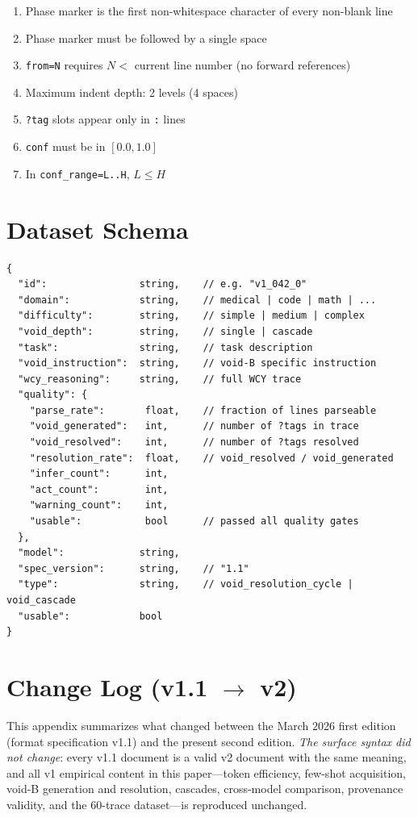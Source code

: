\documentclass[11pt,a4paper]{article}
\begin{document}
\begin{enumerate}[leftmargin=*,itemsep=2pt]
  \item Phase marker is the first non-whitespace character of every non-blank line
  \item Phase marker must be followed by a single space
  \item \texttt{from=N} requires $N <$ current line number (no forward references)
  \item Maximum indent depth: 2 levels (4 spaces)
  \item \texttt{?tag} slots appear only in \texttt{:} lines
  \item \texttt{conf} must be in $[0.0, 1.0]$
  \item In \texttt{conf\_range=L..H}, $L \leq H$
\end{enumerate}

\section{Dataset Schema}
\label{app:schema}

\begin{lstlisting}[language={}]
{
  "id":                string,    // e.g. "v1_042_0"
  "domain":            string,    // medical | code | math | ...
  "difficulty":        string,    // simple | medium | complex
  "void_depth":        string,    // single | cascade
  "task":              string,    // task description
  "void_instruction":  string,    // void-B specific instruction
  "wcy_reasoning":     string,    // full WCY trace
  "quality": {
    "parse_rate":       float,    // fraction of lines parseable
    "void_generated":   int,      // number of ?tags in trace
    "void_resolved":    int,      // number of ?tags resolved
    "resolution_rate":  float,    // void_resolved / void_generated
    "infer_count":      int,
    "act_count":        int,
    "warning_count":    int,
    "usable":           bool      // passed all quality gates
  },
  "model":             string,
  "spec_version":      string,    // "1.1"
  "type":              string,    // void_resolution_cycle | void_cascade
  "usable":            bool
}
\end{lstlisting}

\section{Change Log (v1.1 $\to$ v2)}
\label{app:changelog}

This appendix summarizes what changed between the March 2026 first edition
(format specification v1.1) and the present second edition. \emph{The surface
syntax did not change}: every v1.1 document is a valid v2 document with the
same meaning, and all v1 empirical content in this paper---token efficiency,
few-shot acquisition, void-B generation and resolution, cascades, cross-model
comparison, provenance validity, and the 60-trace dataset---is reproduced
unchanged.
\end{document}

